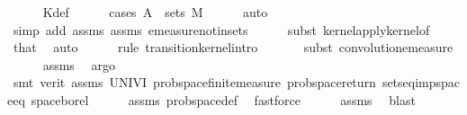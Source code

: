 \begin{isabellebody}
\ \ \ \ \isamarkupfalse%
\ Kdef\isanewline
\ \ \ \ \isamarkupfalse%
\ {\isacharparenleft}{\kern0pt}cases\ {\isachardoublequoteopen}A{\isacharprime}{\kern0pt}\ {\isasymin}\ sets\ M{\isachardoublequoteclose}{\isacharparenright}{\kern0pt}\isanewline
\ \ \ \ \isamarkupfalse%
\ auto\ \isamarkupfalse%
\isanewline
\ \ \ \ \isamarkupfalse%
\ {\isacharparenleft}{\kern0pt}simp\ add{\isacharcolon}{\kern0pt}\ assms{\isacharparenleft}{\kern0pt}{}{\isacharparenright}{\kern0pt}\ assms{\isacharparenleft}{\kern0pt}{}{\isacharparenright}{\kern0pt}\ emeasure{\isacharunderscore}{\kern0pt}notin{\isacharunderscore}{\kern0pt}sets{\isacharparenright}{\kern0pt}\isanewline
\ \ \ \ \isamarkupfalse%
\ {\isacharparenleft}{\kern0pt}subst\ kernel{\isacharunderscore}{\kern0pt}apply{\isacharunderscore}{\kern0pt}kernel{\isacharunderscore}{\kern0pt}of{\isacharparenright}{\kern0pt}\isanewline
\ \ \ \ \isamarkupfalse%
\ that\ \isamarkupfalse%
\ auto\isanewline
\ \ \ \ \isamarkupfalse%
\ {\isacharparenleft}{\kern0pt}rule\ transition{\isacharunderscore}{\kern0pt}kernel{\isachardot}{\kern0pt}intro{\isacharparenright}{\kern0pt}\isanewline
\ \ \ \ \ \isamarkupfalse%
\ {\isacharparenleft}{\kern0pt}subst\ convolution{\isacharunderscore}{\kern0pt}emeasure{\isacharparenright}{\kern0pt}\isanewline
\ \ \ \ \isamarkupfalse%
\ assms\ \isamarkupfalse%
\ argo\isanewline
\ \ \ \ \ \ \ \ \ \ \ \isamarkupfalse%
\ {\isacharparenleft}{\kern0pt}smt\ {\isacharparenleft}{\kern0pt}verit{\isacharparenright}{\kern0pt}\ assms\ UNIV{\isacharunderscore}{\kern0pt}I\ prob{\isacharunderscore}{\kern0pt}space{\isachardot}{\kern0pt}finite{\isacharunderscore}{\kern0pt}measure\ prob{\isacharunderscore}{\kern0pt}space{\isacharunderscore}{\kern0pt}return\ sets{\isacharunderscore}{\kern0pt}eq{\isacharunderscore}{\kern0pt}imp{\isacharunderscore}{\kern0pt}space{\isacharunderscore}{\kern0pt}eq\ space{\isacharunderscore}{\kern0pt}borel{\isacharparenright}{\kern0pt}\isanewline
\ \ \ \ \isamarkupfalse%
\ assms{\isacharparenleft}{\kern0pt}{}{\isacharparenright}{\kern0pt}\ prob{\isacharunderscore}{\kern0pt}space{\isacharunderscore}{\kern0pt}def\ \isamarkupfalse%
\ fastforce\isanewline
\ \ \ \ \isamarkupfalse%
\ assms\ \isamarkupfalse%
\ blast\isanewline

\end{isabellebody}
